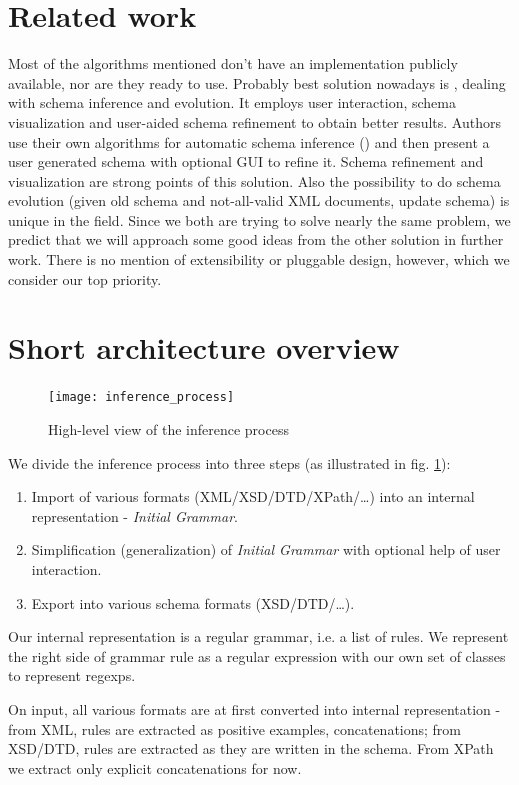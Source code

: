 \documentclass[a4paper,8pt,oneside,twocolumn]{article}
\begin{document}
\section*{Related work}
Most of the algorithms mentioned don't have an implementation publicly available, nor are they ready to use.
Probably best solution nowadays is \cite{Bex:2008:SSI:1376616.1376750}, dealing with schema inference and evolution.
It employs user interaction, schema visualization and user-aided schema refinement to obtain better results.
Authors use their own algorithms for automatic schema inference (\cite{Bex:2006:ICD:1182635.1164139, Bex:2007:IXS:1325851.1325964}) and then present a user generated schema with optional GUI to refine it.
Schema refinement and visualization are strong points of this solution. Also the possibility to do schema evolution (given old schema and not-all-valid XML documents, update schema) is unique in the field.
Since we both are trying to solve nearly the same problem, we predict that we will approach some good ideas from the other solution in further work.
There is no mention of extensibility or pluggable design, however, which we consider our top priority.

\section*{Short architecture overview}
\begin{figure}
	\centering\texttt{[image: inference\_process]}
	\caption{High-level view of the inference process} \label{inference_process}
\end{figure}
We divide the inference process into three steps (as illustrated in fig. \ref{inference_process}):
\begin{enumerate}
	\item Import of various formats (XML/XSD/DTD/XPath/\ldots) into an internal representation - \emph{Initial Grammar}.
	\item Simplification (generalization) of \emph{Initial Grammar} with optional help of user interaction.
	\item Export into various schema formats (XSD/DTD/\ldots).
\end{enumerate}	
Our internal representation is a regular grammar, i.e. a list of rules.
We represent the right side of grammar rule as a regular expression with our own set of classes to represent regexps.

On input, all various formats are at first converted into internal representation - from XML, rules are extracted as positive examples, concatenations; from XSD/DTD, rules are extracted as they are written in the schema. From XPath we extract only explicit concatenations for now.
\end{document}
